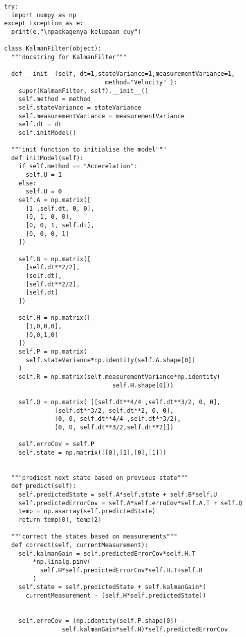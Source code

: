 \begin{lstlisting}
try:
  import numpy as np	
except Exception as e:
  print(e,"\npackagenya kelupaan cuy")

class KalmanFilter(object):
  """docstring for KalmanFilter"""

  def __init__(self, dt=1,stateVariance=1,measurementVariance=1, 
                            method="Velocity" ):
    super(KalmanFilter, self).__init__()
    self.method = method
    self.stateVariance = stateVariance
    self.measurementVariance = measurementVariance
    self.dt = dt
    self.initModel()
  
  """init function to initialise the model"""
  def initModel(self): 
    if self.method == "Accerelation":
      self.U = 1
    else: 
      self.U = 0
    self.A = np.matrix([
      [1 ,self.dt, 0, 0], 
      [0, 1, 0, 0], 
      [0, 0, 1, self.dt],  
      [0, 0, 0, 1]
    ])

    self.B = np.matrix([
      [self.dt**2/2], 
      [self.dt], 
      [self.dt**2/2], 
      [self.dt]
    ])
    
    self.H = np.matrix([
      [1,0,0,0],
      [0,0,1,0]
    ]) 
    self.P = np.matrix(
      self.stateVariance*np.identity(self.A.shape[0])
    )
    self.R = np.matrix(self.measurementVariance*np.identity(
                              self.H.shape[0]))
    
    self.Q = np.matrix( [[self.dt**4/4 ,self.dt**3/2, 0, 0], 
              [self.dt**3/2, self.dt**2, 0, 0], 
              [0, 0, self.dt**4/4 ,self.dt**3/2],
              [0, 0, self.dt**3/2,self.dt**2]])
    
    self.erroCov = self.P
    self.state = np.matrix([[0],[1],[0],[1]])


  """predicst next state based on previous state"""
  def predict(self):
    self.predictedState = self.A*self.state + self.B*self.U
    self.predictedErrorCov = self.A*self.erroCov*self.A.T + self.Q
    temp = np.asarray(self.predictedState)
    return temp[0], temp[2]

  """correct the states based on measurements"""
  def correct(self, currentMeasurement):
    self.kalmanGain = self.predictedErrorCov*self.H.T
        *np.linalg.pinv(
          self.H*self.predictedErrorCov*self.H.T+self.R
        )
    self.state = self.predictedState + self.kalmanGain*(
      currentMeasurement - (self.H*self.predictedState))
    

    self.erroCov = (np.identity(self.P.shape[0]) - 
                self.kalmanGain*self.H)*self.predictedErrorCov  
\end{lstlisting}